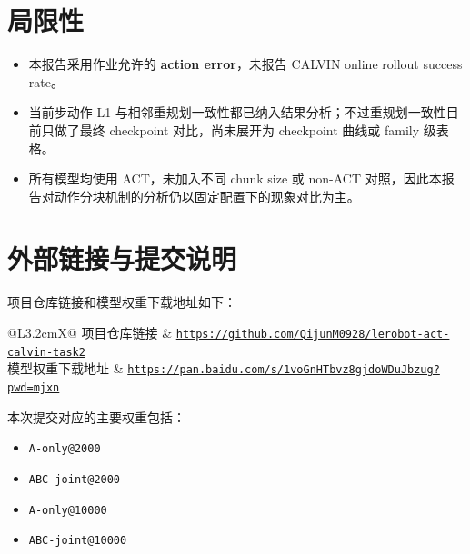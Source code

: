 \documentclass{article}
\begin{document}
\section{局限性}

\begin{itemize}
  \item 本报告采用作业允许的 \textbf{action error}，未报告 CALVIN online rollout success rate。
  \item 当前步动作 L1 与相邻重规划一致性都已纳入结果分析；不过重规划一致性目前只做了最终 checkpoint 对比，尚未展开为 checkpoint 曲线或 family 级表格。
  \item 所有模型均使用 ACT，未加入不同 chunk size 或 non-ACT 对照，因此本报告对动作分块机制的分析仍以固定配置下的现象对比为主。
\end{itemize}

\section{外部链接与提交说明}

项目仓库链接和模型权重下载地址如下：

\begin{tabularx}{\linewidth}{@{}L{3.2cm}X@{}}
项目仓库链接 & \href{https://github.com/QijunM0928/lerobot-act-calvin-task2}{\nolinkurl{https://github.com/QijunM0928/lerobot-act-calvin-task2}} \\
模型权重下载地址 & \href{https://pan.baidu.com/s/1voGnHTbvz8gjdoWDuJbzug?pwd=mjxn}{\nolinkurl{https://pan.baidu.com/s/1voGnHTbvz8gjdoWDuJbzug?pwd=mjxn}} \\
\end{tabularx}

本次提交对应的主要权重包括：
\begin{itemize}
  \item \texttt{A-only@2000}
  \item \texttt{ABC-joint@2000}
  \item \texttt{A-only@10000}
  \item \texttt{ABC-joint@10000}
\end{itemize}



\end{document}
